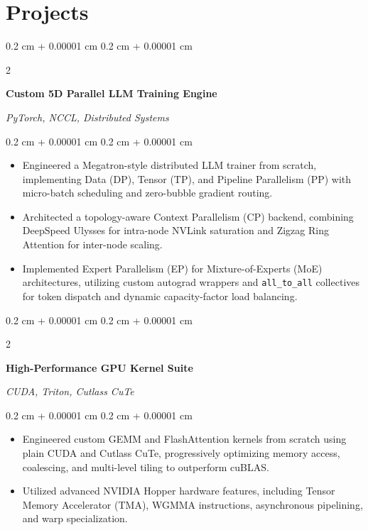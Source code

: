 \documentclass[10pt, letterpaper]{article}
\newenvironment{highlights}{
    \begin{itemize}[
        topsep=0.10 cm,
        parsep=0.10 cm,
        partopsep=0pt,
        itemsep=0pt,
        leftmargin=0.4 cm + 10pt
    ]
}{
    \end{itemize}
} %
\newenvironment{onecolentry}{
    \begin{adjustwidth}{
        0.2 cm + 0.00001 cm
    }{
        0.2 cm + 0.00001 cm
    }
}{
    \end{adjustwidth}
} %
\newenvironment{twocolentry}[2][]{
    \onecolentry
    \def\secondColumn{#2}
    \setcolumnwidth{\fill, 4.5 cm}
    \begin{paracol}{2}
}{
    \switchcolumn \raggedleft \secondColumn
    \end{paracol}
    \endonecolentry
} %
\begin{document}
    \section{Projects}

        \begin{twocolentry}{
            \textit{PyTorch, NCCL, Distributed Systems}
        }
            \textbf{Custom 5D Parallel LLM Training Engine}
        \end{twocolentry}

        \vspace{0.10 cm}
        \begin{onecolentry}
            \begin{highlights}
                \item Engineered a Megatron-style distributed LLM trainer from scratch, implementing Data (DP), Tensor (TP), and Pipeline Parallelism (PP) with micro-batch scheduling and zero-bubble gradient routing.
                \item Architected a topology-aware Context Parallelism (CP) backend, combining DeepSpeed Ulysses for intra-node NVLink saturation and Zigzag Ring Attention for inter-node scaling.
                \item Implemented Expert Parallelism (EP) for Mixture-of-Experts (MoE) architectures, utilizing custom autograd wrappers and \texttt{all\_to\_all} collectives for token dispatch and dynamic capacity-factor load balancing.
            \end{highlights}
        \end{onecolentry}

        \vspace{0.2 cm}

        \begin{twocolentry}{
            \textit{CUDA, Triton, Cutlass CuTe}
        }
            \textbf{High-Performance GPU Kernel Suite}
        \end{twocolentry}

        \vspace{0.10 cm}
        \begin{onecolentry}
            \begin{highlights}
                \item Engineered custom GEMM and FlashAttention kernels from scratch using plain CUDA and Cutlass CuTe, progressively optimizing memory access, coalescing, and multi-level tiling to outperform cuBLAS.
                \item Utilized advanced NVIDIA Hopper hardware features, including Tensor Memory Accelerator (TMA), WGMMA instructions, asynchronous pipelining, and warp specialization.
            \end{highlights}
        \end{onecolentry}
\end{document}
